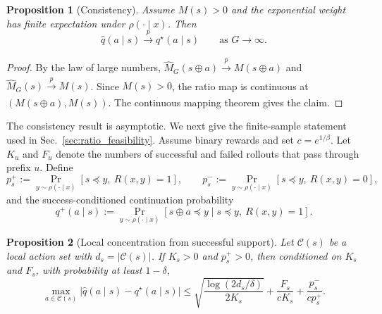 \documentclass{article}
\newtheorem{proposition}{Proposition}[section]
\begin{document}
\begin{proposition}[Consistency]
\label{prop:ratio_consistency}
Assume $M(s)>0$ and the exponential weight has finite expectation under
$\rho(\cdot\mid x)$. Then
\begin{equation}
\widehat q(a\mid s)
\xrightarrow[]{p}
q^\star(a\mid s)
\qquad \text{as } G\to\infty .
\end{equation}
\end{proposition}

\begin{proof}
By the law of large numbers,
$\widehat M_G(s\oplus a)\xrightarrow[]{p}M(s\oplus a)$ and
$\widehat M_G(s)\xrightarrow[]{p}M(s)$. Since $M(s)>0$, the ratio map is
continuous at $(M(s\oplus a),M(s))$. The continuous mapping theorem gives the
claim.
\end{proof}

The consistency result is asymptotic. We next give the finite-sample statement
used in Sec.~\ref{sec:ratio_feasibility}. Assume binary rewards and set
$c=e^{1/\beta}$. Let $K_u$ and $F_u$ denote the numbers of successful and failed
rollouts that pass through prefix $u$. Define
\begin{equation}
p_s^+
:=
\Pr_{y\sim\rho(\cdot\mid x)}[s\preceq y,\ R(x,y)=1],
\qquad
p_s^-
:=
\Pr_{y\sim\rho(\cdot\mid x)}[s\preceq y,\ R(x,y)=0],
\end{equation}
and the success-conditioned continuation probability
\begin{equation}
q^+(a\mid s)
:=
\Pr_{y\sim\rho(\cdot\mid x)}
[s\oplus a\preceq y \mid s\preceq y,\ R(x,y)=1].
\end{equation}

\begin{proposition}[Local concentration from successful support]
\label{prop:local_success_concentration}
Let $\mathcal{C}(s)$ be a local action set with $d_s=|\mathcal{C}(s)|$.
If $K_s>0$ and $p_s^+>0$, then conditioned on $K_s$ and $F_s$, with probability
at least $1-\delta$,
\begin{equation}
\max_{a\in\mathcal{C}(s)}
\left|
\widehat q(a\mid s)-q^\star(a\mid s)
\right|
\le
\sqrt{\frac{\log(2d_s/\delta)}{2K_s}}
+
\frac{F_s}{cK_s}
+
\frac{p_s^-}{cp_s^+}.
\label{eq:appendix_local_concentration}
\end{equation}
\end{proposition}
\end{document}
